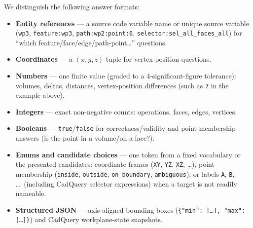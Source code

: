 \documentclass[10pt]{article}
\begin{document}
We distinguish the following answer formats:
\begin{itemize}
  \item \textbf{Entity references} --- a source code variable name or unique source variable (\texttt{wp3}, \texttt{feature:wp3}, \texttt{path:wp2:point:6}, \texttt{selector:sel\_all\_faces\_all}) for ``which feature/face/edge/path-point\ldots'' questions.
  \item \textbf{Coordinates} --- a $(x, y, z)$ tuple for vertex position questions.
  \item \textbf{Numbers} --- one finite value (graded to a 4-significant-figure tolerance): volumes, deltas, distances, vertex-position differences (such as \texttt{7} in the example above).
  \item \textbf{Integers} --- exact non-negative counts: operations, faces, edges, vertices.
  \item \textbf{Booleans} --- \texttt{true}/\texttt{false} for correctness/validity and point-membership answers (is the point in a volume/on a face?).
  \item \textbf{Enums and candidate choices} --- one token from a fixed vocabulary or the presented candidates: coordinate frames (\texttt{XY}, \texttt{YZ}, \texttt{XZ}, \ldots), point membership (\texttt{inside}, \texttt{outside}, \texttt{on\_boundary}, \texttt{ambiguous}), or labels \texttt{A}, \texttt{B}, \ldots\ (including CadQuery selector expressions) when a target is not readily nameable.
  \item \textbf{Structured JSON} --- axis-aligned bounding boxes (\texttt{\{"min": [\ldots], "max": [\ldots]\}}) and CadQuery workplane-state snapshots.
\end{itemize}
\end{document}

